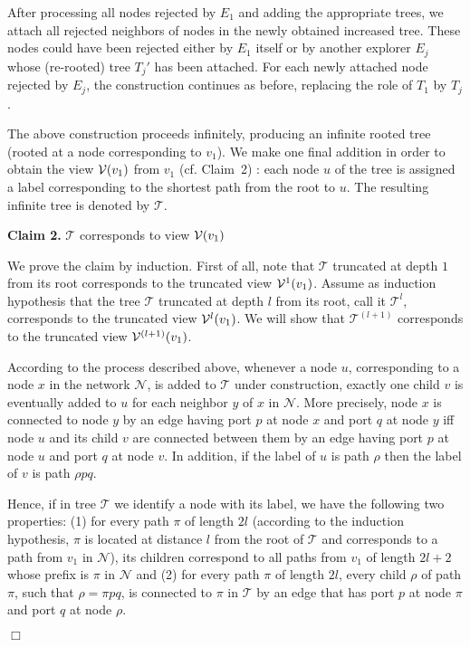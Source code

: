 \documentclass[11pt]{article}
\newcommand{\qed}{\hfill $\Box$ \bigbreak}
\newenvironment{proof}{\noindent {\bf Proof.}}{\qed}
\newcommand{\cV}{{\cal V}}
\begin{document}
\begin{proof}
After processing all nodes rejected by $E_1$ and adding the appropriate trees, we attach all rejected neighbors of nodes in the newly obtained increased
tree. These nodes could have been rejected either by $E_1$ itself or by another explorer $E_j$ whose (re-rooted) tree $T_j'$ has been attached.
For each newly attached node rejected by $E_j$, the construction continues as before, replacing the role of $T_1$ by $T_j$.

{The above construction proceeds infinitely, producing an infinite rooted tree (rooted at a node corresponding to $v_1$). We make one final addition in order to obtain the view $\cV(v_1)$ from $v_1$ (cf. Claim~2) : each node $u$ of the tree is assigned a label corresponding to the shortest path from the root to $u$. The resulting infinite tree is denoted by $\mathcal{T}$}.

\vspace*{0.3cm}
\noindent
{{\bf Claim 2.} $\mathcal{T}$ corresponds to view $\cV(v_1)$}

{We prove the claim by induction. First of all, note that $\mathcal{T}$ truncated at depth $1$ from its root corresponds to the truncated view $\cV^1(v_1)$.
Assume as induction hypothesis that the tree $\mathcal{T}$ truncated at depth $l$ from its root, call it $\mathcal{T}^l$, corresponds to the truncated view $\cV^l(v_1)$. We will show that $\mathcal{T}^{(l+1)}$ corresponds to the truncated view $\cV^{(l+1)}(v_1)$.}

{According to the process described above, whenever a node $u$, corresponding to a node $x$ in the network $\mathcal{N}$, is added to $\mathcal{T}$ under construction, exactly one child $v$ is eventually added to $u$ for each neighbor $y$ of $x$ in $\mathcal{N}$. More precisely, node $x$ is connected to node $y$ by an edge having port $p$ at node $x$ and port $q$ at node $y$ iff node $u$ and its child $v$ are connected between them by an edge having port $p$ at node $u$ and port $q$ at node $v$. In addition, if the label of $u$ is path $\rho$ then the label of $v$ is path $\rho pq$.}

{Hence, if in tree $\mathcal{T}$ we identify a node with its label, we have the following two properties: (1) for every path $\pi$ of length $2l$ (according to the induction hypothesis, $\pi$ is located at distance $l$ from the root of $\mathcal{T}$ and corresponds to a path from $v_1$ in $\mathcal{N}$), its children correspond to all paths from $v_1$ of length $2l+2$ whose prefix is $\pi$ in $\mathcal{N}$ and (2) for every path $\pi$ of length $2l$, every child $\rho$ of path $\pi$, such that $\rho=\pi pq$, is connected to $\pi$ in $\mathcal{T}$ by an edge that has port $p$ at node $\pi$ and port $q$ at node $\rho$.}


\end{proof}
\end{document}
